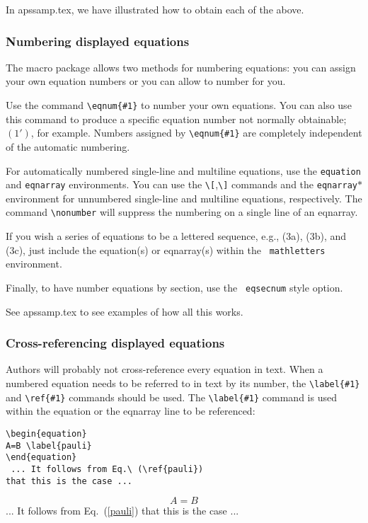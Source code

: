 In apssamp.tex, we have illustrated how to obtain each of the above.


\subsubsection{Numbering displayed equations}

The \REVTeX{} macro package allows two methods for numbering equations: you
can assign your own equation numbers or you can allow \REVTeX{} to number
for you.

Use the command \verb+\eqnum{#1}+ to number your own equations. You can
also use this command to produce a specific equation number not normally
obtainable; $(1')$, for example. Numbers assigned by \verb+\eqnum{#1}+ are
completely independent of the automatic numbering.

For automatically numbered single-line and multiline equations, use the
{\tt equation} and {\tt eqnarray} environments. You can use the
\verb+\[+,\verb+\]+ commands and the {\tt eqnarray$\ast$} environment for
unnumbered single-line and multiline equations, respectively. The command
\verb+\nonumber+ will suppress the numbering on a single line of an
eqnarray.

If you wish a series of equations to be a lettered sequence, e.g., (3a),
(3b), and (3c), just include the equation(s) or eqnarray(s) within the {\tt
mathletters} environment.

Finally, to have \REVTeX{} number equations by section, use the {\tt
eqsecnum} style option.

See apssamp.tex to see examples of how all this works.

\subsubsection{Cross-referencing displayed equations}

Authors will probably not cross-reference every equation in text. When a
numbered equation needs to be referred to in text by its number, the
\verb+\label{#1}+ and \verb+\ref{#1}+ commands should be used. The
\verb+\label{#1}+ command is used within the equation or the eqnarray line
to be referenced:

\smallskip

\begin{verbatim}
\begin{equation}
A=B \label{pauli}
\end{equation}
 ... It follows from Eq.\ (\ref{pauli})
that this is the case ...
\end{verbatim}
\begin{equation}
A=B \label{pauli}
\end{equation}
 ... It follows from Eq.\ (\ref{pauli})  that this
is the case ...

